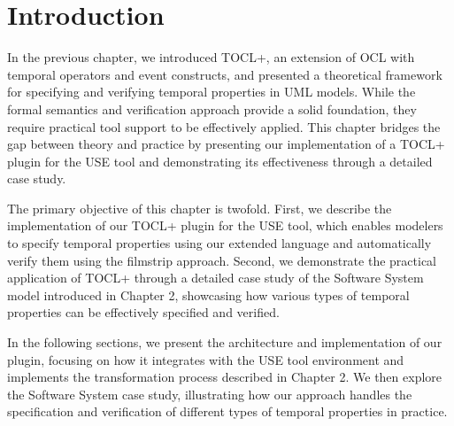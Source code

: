 \section{Introduction}

\hspace{1cm} In the previous chapter, we introduced TOCL+, an extension of OCL with 
temporal operators and event constructs, and presented a theoretical framework for 
specifying and verifying temporal properties in UML models. While the formal semantics 
and verification approach provide a solid foundation, they require practical tool 
support to be effectively applied. This chapter bridges the gap between theory and 
practice by presenting our implementation of a TOCL+ plugin for the USE tool and 
demonstrating its effectiveness through a detailed case study.

The primary objective of this chapter is twofold. First, we describe the 
implementation of our TOCL+ plugin for the USE tool, which enables modelers to 
specify temporal properties using our extended language and automatically verify 
them using the filmstrip approach. Second, we demonstrate the practical application 
of TOCL+ through a detailed case study of the Software System model introduced in 
Chapter 2, showcasing how various types of temporal properties can be effectively 
specified and verified.

In the following sections, we present the architecture and implementation of our 
plugin, focusing on how it integrates with the USE tool environment and implements 
the transformation process described in Chapter 2. We then explore the Software 
System case study, illustrating how our approach handles the specification and 
verification of different types of temporal properties in practice.